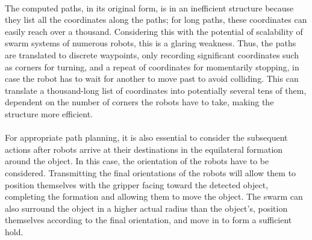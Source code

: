 \paragraph*{}
The computed paths, in its original form, is in an inefficient structure because they list all the coordinates along the paths; for long paths, these coordinates can easily reach over a thousand. Considering this with the potential of scalability of swarm systems of numerous robots, this is a glaring weakness. Thus, the paths are translated to discrete waypoints, only recording significant coordinates such as corners for turning, and a repeat of coordinates for momentarily stopping, in case the robot has to wait for another to move past to avoid colliding. This can translate a thousand-long list of coordinates into potentially several tens of them, dependent on the number of corners the robots have to take, making the structure more efficient.

\paragraph*{}
For appropriate path planning, it is also essential to consider the subsequent actions after robots arrive at their destinations in the equilateral formation around the object. In this case, the orientation of the robots have to be considered. Transmitting the final orientations of the robots will allow them to position themselves with the gripper facing toward the detected object, completing the formation and allowing them to move the object. The swarm can also surround the object in a higher actual radius than the object's, position themselves according to the final orientation, and move in to form a sufficient hold. 
